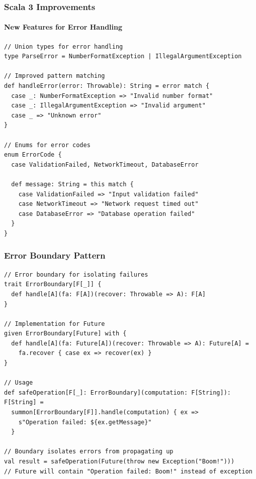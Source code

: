 \documentclass{beamer}
\begin{document}
\begin{frame}[fragile]
\frametitle{Scala 3 Improvements}
\framesubtitle{New Features for Error Handling}

\begin{lstlisting}[style=scalaStyle]
// Union types for error handling
type ParseError = NumberFormatException | IllegalArgumentException

// Improved pattern matching
def handleError(error: Throwable): String = error match {
  case _: NumberFormatException => "Invalid number format"
  case _: IllegalArgumentException => "Invalid argument"
  case _ => "Unknown error"
}

// Enums for error codes
enum ErrorCode {
  case ValidationFailed, NetworkTimeout, DatabaseError
  
  def message: String = this match {
    case ValidationFailed => "Input validation failed"
    case NetworkTimeout => "Network request timed out"
    case DatabaseError => "Database operation failed"
  }
}
\end{lstlisting}

\end{frame}

\begin{frame}[fragile]
\frametitle{Error Boundary Pattern}

\begin{lstlisting}[style=scalaStyle]
// Error boundary for isolating failures
trait ErrorBoundary[F[_]] {
  def handle[A](fa: F[A])(recover: Throwable => A): F[A]
}

// Implementation for Future
given ErrorBoundary[Future] with {
  def handle[A](fa: Future[A])(recover: Throwable => A): Future[A] = 
    fa.recover { case ex => recover(ex) }
}

// Usage
def safeOperation[F[_]: ErrorBoundary](computation: F[String]): F[String] = 
  summon[ErrorBoundary[F]].handle(computation) { ex =>
    s"Operation failed: ${ex.getMessage}"
  }

// Boundary isolates errors from propagating up
val result = safeOperation(Future(throw new Exception("Boom!")))
// Future will contain "Operation failed: Boom!" instead of exception
\end{lstlisting}

\end{frame}
\end{document}
